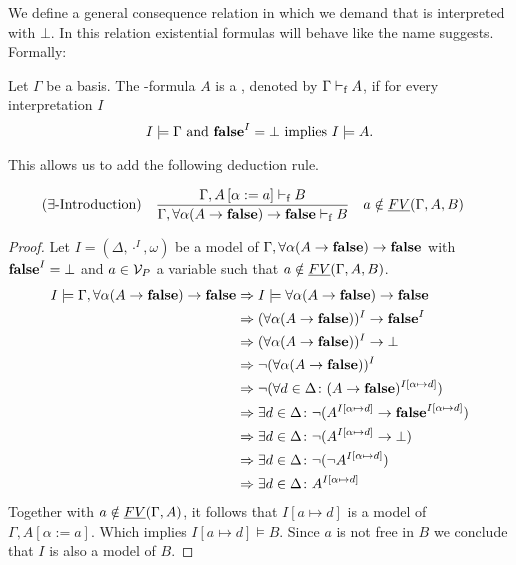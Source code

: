 We define a general consequence relation in which we demand that \false{} is interpreted with $\bot$. In this relation existential formulas will behave like the name suggests. Formally:
\begin{definition}
Let $\Gamma$ be a basis. The \SysP-formula $A$ is a , denoted by $\Gamma\vdash_\text{f} A$, if for every interpretation $I$
\[I\models\Gamma \text{ and } \textbf{false}^I=\bot\text{ implies }I\models A.\]

This allows us to add the following deduction rule.
\begin{mdframed}
	\begin{align*}
		  & (\exists\text{-Introduction}) &   & \frac 
		{\Gamma,A\left[\alpha:=a\right]\vdash_\text{f} B}
		{\Gamma,\forall\alpha(A\to\textbf{false})\to\textbf{false}\vdash_\text{f} B} && a\notin\emph{FV}(\Gamma,A,B)
	\end{align*}
\end{mdframed}
\end{definition}
\begin{proof}
	Let $I=(\Delta,\cdot^I,\omega)$ be a model of $\Gamma,\forall\alpha(A\to\textbf{false})\to\textbf{false}$ with $\textbf{false}^I=\bot$ and $a\in\mathcal{V}_P$ a variable such that $a\notin\emph{FV}(\Gamma,A,B)$.
	\begin{align*}
		I\models\Gamma,\forall\alpha(A\to\textbf{false})\to\textbf{false} & \Rightarrow I\models\forall\alpha(A\to\textbf{false})\to\textbf{false}                                                          \\
        & \Rightarrow (\forall\alpha(A\to\textbf{false}))^I\to\textbf{false}^I                                                            \\
        & \Rightarrow (\forall\alpha(A\to\textbf{false}))^I\to\bot                                                                \\
        & \Rightarrow \neg(\forall\alpha(A\to\textbf{false}))^I                                                                   \\
        & \Rightarrow \neg(\forall d\in\Delta\colon(A\to\textbf{false})^{I\left[\alpha\mapsto d\right]})                               \\
        & \Rightarrow \exists d\in\Delta\colon\neg(A^{I\left[\alpha\mapsto d\right]}\to\textbf{false}^{I\left[\alpha\mapsto d\right]}) \\
        & \Rightarrow \exists d\in\Delta\colon\neg(A^{I\left[\alpha\mapsto d\right]}\to\bot)                                   \\
        & \Rightarrow \exists d\in\Delta\colon\neg(\neg A^{I\left[\alpha\mapsto d\right]})                                     \\
        & \Rightarrow \exists d\in\Delta\colon A^{I\left[\alpha\mapsto d\right]}
	\end{align*}
	Together with $a\notin\emph{FV}(\Gamma,A)$, it follows that $I\left[a\mapsto d\right]$ is a model of $\Gamma,A\left[\alpha:=a\right]$. Which implies $I\left[a\mapsto d\right]\models B$.	Since $a$ is not free in $B$ we conclude that $I$ is also a model of $B$.
\end{proof}

